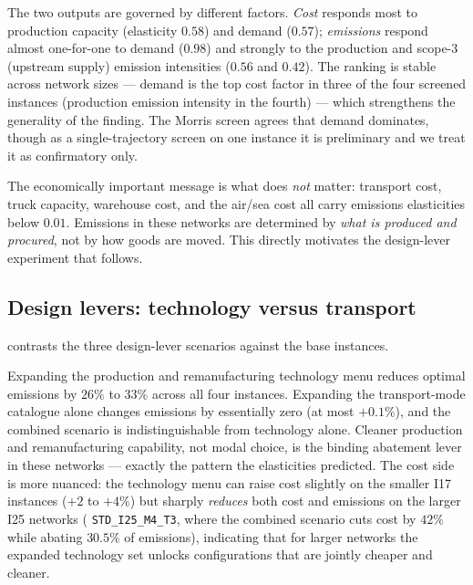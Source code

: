 \begin{table}[ht]
  \centering
  \caption{Normalized local sensitivity (OAT elasticities).}
  \label{tab:sensitivity}
  
\end{table}

The two outputs are governed by different factors. \emph{Cost} responds most
to production capacity (elasticity $0.58$) and demand ($0.57$); \emph{emissions}
respond almost one-for-one to demand ($0.98$) and strongly to the production
and scope-3 (upstream supply) emission intensities ($0.56$ and $0.42$). The
ranking is stable across network sizes --- demand is the top cost factor in
three of the four screened instances (production emission intensity in the
fourth) --- which strengthens the generality of the finding. The Morris screen
agrees that demand dominates, though as a single-trajectory screen on one
instance it is preliminary and we treat it as confirmatory only.

The economically important message is what does \emph{not} matter:
transport cost, truck capacity, warehouse cost, and the air/sea cost all carry
emissions elasticities below $0.01$. Emissions in these networks are
determined by \emph{what is produced and procured}, not by how goods are
moved. This directly motivates the design-lever experiment that follows.

\subsection{Design levers: technology versus transport}
\label{sec:exp:scenarios}

 contrasts the three design-lever scenarios against the
base instances.

\begin{table}[ht]
  \centering
  \caption{Optimal-response emissions under the design-lever scenarios.}
  \label{tab:scenarios}
  
\end{table}

Expanding the production and remanufacturing technology menu reduces optimal
emissions by $26\%$ to $33\%$ across all four instances. Expanding the
transport-mode catalogue alone changes emissions by essentially zero (at most
$+0.1\%$), and the combined scenario is indistinguishable from technology
alone. Cleaner production and remanufacturing capability, not modal choice, is
the binding abatement lever in these networks --- exactly the pattern the
elasticities predicted. The cost side is more nuanced: the technology menu can
raise cost slightly on the smaller I17 instances ($+2$ to $+4\%$) but sharply
\emph{reduces} both cost and emissions on the larger I25 networks (\eg
\texttt{STD\_I25\_M4\_T3}, where the combined scenario cuts cost by $42\%$
while abating $30.5\%$ of emissions), indicating that for larger networks the
expanded technology set unlocks configurations that are jointly cheaper and
cleaner.

